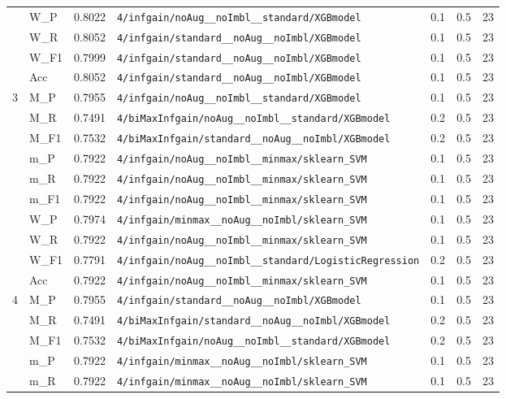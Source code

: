 \begin{table}[htbp]
\begin{tabular}{|c|l|c|>{\ttfamily\footnotesize}p{7.2cm}|c|c|c|}
 & W\_P & 0.8022 & \texttt{4/infgain/noAug\_\_noImbl\_\_standard/XGBmodel} & 0.1 & 0.5  & 23 \\ 
 & W\_R & 0.8052 & \texttt{4/infgain/standard\_\_noAug\_\_noImbl/XGBmodel} & 0.1 & 0.5  & 23 \\ 
 & W\_F1 & 0.7999 & \texttt{4/infgain/standard\_\_noAug\_\_noImbl/XGBmodel} & 0.1 & 0.5  & 23 \\ 
 & Acc & 0.8052 & \texttt{4/infgain/standard\_\_noAug\_\_noImbl/XGBmodel} & 0.1 & 0.5  & 23 \\ 
\hline
\multirow{10}{*}{3} & M\_P & 0.7955 & \texttt{4/infgain/noAug\_\_noImbl\_\_standard/XGBmodel} & 0.1 & 0.5  & 23 \\ 
 & M\_R & 0.7491 & \texttt{4/biMaxInfgain/noAug\_\_noImbl\_\_standard/XGBmodel} & 0.2 & 0.5  & 23 \\ 
 & M\_F1 & 0.7532 & \texttt{4/biMaxInfgain/standard\_\_noAug\_\_noImbl/XGBmodel} & 0.2 & 0.5  & 23 \\ 
 & m\_P & 0.7922 & \texttt{4/infgain/noAug\_\_noImbl\_\_minmax/sklearn\_SVM} & 0.1 & 0.5  & 23 \\ 
 & m\_R & 0.7922 & \texttt{4/infgain/noAug\_\_noImbl\_\_minmax/sklearn\_SVM} & 0.1 & 0.5  & 23 \\ 
 & m\_F1 & 0.7922 & \texttt{4/infgain/noAug\_\_noImbl\_\_minmax/sklearn\_SVM} & 0.1 & 0.5  & 23 \\ 
 & W\_P & 0.7974 & \texttt{4/infgain/minmax\_\_noAug\_\_noImbl/sklearn\_SVM} & 0.1 & 0.5  & 23 \\ 
 & W\_R & 0.7922 & \texttt{4/infgain/noAug\_\_noImbl\_\_minmax/sklearn\_SVM} & 0.1 & 0.5  & 23 \\ 
 & W\_F1 & 0.7791 & \texttt{4/infgain/noAug\_\_noImbl\_\_standard/LogisticRegression} & 0.2 & 0.5  & 23 \\ 
 & Acc & 0.7922 & \texttt{4/infgain/noAug\_\_noImbl\_\_minmax/sklearn\_SVM} & 0.1 & 0.5  & 23 \\ 
\hline
\multirow{10}{*}{4} & M\_P & 0.7955 & \texttt{4/infgain/standard\_\_noAug\_\_noImbl/XGBmodel} & 0.1 & 0.5  & 23 \\ 
 & M\_R & 0.7491 & \texttt{4/biMaxInfgain/standard\_\_noAug\_\_noImbl/XGBmodel} & 0.2 & 0.5  & 23 \\ 
 & M\_F1 & 0.7532 & \texttt{4/biMaxInfgain/noAug\_\_noImbl\_\_standard/XGBmodel} & 0.2 & 0.5  & 23 \\ 
 & m\_P & 0.7922 & \texttt{4/infgain/minmax\_\_noAug\_\_noImbl/sklearn\_SVM} & 0.1 & 0.5  & 23 \\ 
 & m\_R & 0.7922 & \texttt{4/infgain/minmax\_\_noAug\_\_noImbl/sklearn\_SVM} & 0.1 & 0.5  & 23 \\ 

\end{tabular}
\end{table}

